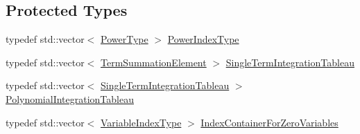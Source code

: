 \subsection*{Protected Types}
\begin{DoxyCompactItemize}
\item 
typedef std\+::vector$<$ \hyperlink{classnmr_bernstein_polynomial_line_integral_a0e07aee2cb7c5f3f5d2c1f95cd4e9abf}{Power\+Type} $>$ \hyperlink{classnmr_bernstein_polynomial_line_integral_a16dae5a5a7adabc4c3356c857aeb3841}{Power\+Index\+Type}
\item 
typedef std\+::vector$<$ \hyperlink{structnmr_bernstein_polynomial_line_integral_1_1_term_summation_element}{Term\+Summation\+Element} $>$ \hyperlink{classnmr_bernstein_polynomial_line_integral_a1d31908eb8195d1c00427f12dee7fe6b}{Single\+Term\+Integration\+Tableau}
\item 
typedef std\+::vector$<$ \hyperlink{classnmr_bernstein_polynomial_line_integral_a1d31908eb8195d1c00427f12dee7fe6b}{Single\+Term\+Integration\+Tableau} $>$ \hyperlink{classnmr_bernstein_polynomial_line_integral_a60deb00991c5e0971d60280bcbb7a405}{Polynomial\+Integration\+Tableau}
\item 
typedef std\+::vector$<$ \hyperlink{classnmr_bernstein_polynomial_line_integral_a125fa9ed7f5718e92272974aee68b27a}{Variable\+Index\+Type} $>$ \hyperlink{classnmr_bernstein_polynomial_line_integral_ad240bb2714fe8f3ce33ba2fa696931f8}{Index\+Container\+For\+Zero\+Variables}
\end{DoxyCompactItemize}
